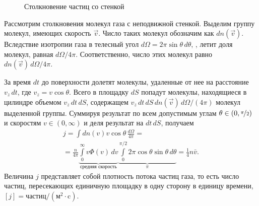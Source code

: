 \begin{figure}
    \vspace{-1pc}
    \centering
    \caption{Столкновение частиц со стенкой}
    \label{pic:maxwell-mean-particle-collision}
\end{figure}
Рассмотрим столкновения молекул газа с неподвижной стенкой. Выделим группу молекул, имеющих скорость $\vec v$. Число таких молекул обозначим как $d n(\vec{v})$. Вследствие изотропии газа в телесный угол $d \Omega = 2 \pi \sin \theta \, d \theta$, , летит доля молекул, равная $d \Omega / 4 \pi$. Соответственно, число этих молекул равно $dn(\vec{v}) \, d \Omega / 4 \pi$. 

За время $dt$ до поверхности долетят молекулы, удаленные от нее на расстояние $v_z \, dt$, где $v_z = v \cos \theta$. Всего в площадку $dS$ попадут молекулы, находящиеся в цилиндре объемом $v_z \, dt \, dS$, содержащем $v_z \, dt \, dS \, dn(\vec{v}) \, d\Omega / (4 \pi)$ молекул выделенной группы. Суммируя результат по всем допустимым углам $\theta \in (0, \nicefrac{\pi}{2})$ и скоростям $v \in (0, \infty)$ и деля результат на $d t \, d S$, получаем
\begin{multline}
    j 
        = \int d n(v) v \cos \theta \, \frac{d \Omega}{4 \pi} = \\
        = \frac{n}{4 \pi} \underbrace{\int\limits_0^{\infty} v \Phi(v) \, d v}_{\text{средняя скорость}} \underbrace{\int\limits_0^{\pi / 2} 2 \pi \cos \theta \sin \theta \, d \theta}_{\pi}
        = \frac{1}{4} n \bar{v} .
    \label{eq:mean-count-mxwl}
\end{multline}
Величина $j$ представляет собой плотность потока частиц газа, то есть число частиц, пересекающих единичную площадку в одну сторону в единицу времени, $[j]= \text{частиц}/\left(\text{м}^2 \cdot \text{c}\right)$.

